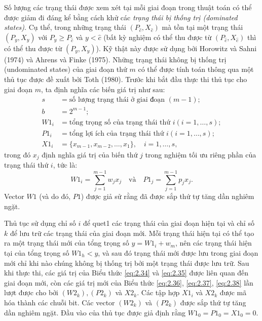 Số lượng các trạng thái được xem xét tại mỗi giai đoạn trong thuật toán có thể được giảm đi đáng kể bằng cách khử các \emph{trạng thái bị thống trị (dominated states)}. Cụ thể, trong những trạng thái $(P_{\hat{c}}, X_{\hat{c}})$ mà tồn tại một trạng thái $(P_y, X_y)$ với $P_y \geq P_{\hat{c}}$ và $y < \hat{c}$ (bất kỳ nghiệm có thể thu được từ $(P_{\hat{c}}, X_{\hat{c}})$ thì có thể thu được từ $(P_y, X_y)$). Kỹ thật này được sử dụng bởi Horowitz và Sahni (1974) và Ahrens và Finke (1975). Những trạng thái không bị thống trị (undominated states) của giai đoạn thứ $m$ có thể được tính toán thông qua một thủ tục được đề xuất bởi Toth (1980). Trước khi bắt đầu thực thi thủ tục cho giai đoạn $m$, ta định nghĩa các biến giá trị như sau:
\begin{align}
    \label{eq:2.34}
    s &= \text{số lượng trạng thái ở giai đoạn }(m - 1);\\
    \label{eq:2.35}
    b &= 2^{m-1};\\
    \label{eq:2.36}
    W1_i &= \text{tổng trọng số của trạng thái thứ }i (i=1, \dots, s);\\
    \label{eq:2.37}
    P1_i &= \text{tổng lợi ích của trạng thái thứ }i (i=1, \dots, s);\\
    \label{eq:2.38}
    X1_i &= \{x_{m-1}, x_{m-2},\dots, x_1\},\quad i = 1,\dots,s,
\end{align}
trong đó $x_j$ định nghĩa giá trị của biến thứ $j$ trong nghiệm tối ưu riêng phần của trạng thái thứ $i$, tức là:
\begin{equation*}
    W1_i = \sum_{j=1}^{m-1}w_jx_j\quad\text{và}\quad P1_j = \sum_{j=1}^{m-1}p_jx_j.
\end{equation*}
Vector $W1$ (và do đó, $P1$) được giả sử rằng đã được sắp thứ tự tăng dần nghiêm ngặt.

Thủ tục sử dụng chỉ số $i$ để quet1 các trạng thái của giai đoạn hiện tại và chỉ số $k$ để lưu trữ các trạng thái của giai đoạn mới. Mỗi trạng thái hiện tại có thể tạo ra một trạng thái mới của tổng trọng số $y = W1_{i} + w_m$, nên các trạng thái hiện tại của tổng trọng số $W1_h < y$, và sau đó trạng thái mới được lưu trong giai đoạn mới chỉ khi nào chúng không bị thống trị bởi một trạng thái được lưu trữ. Sau khi thực thi, các giá trị của Biểu thức \eqref{eq:2.34} và \eqref{eq:2.35} được liên quan đến giai đoạn mới, còn các giá trị mới của Biểu thức \eqref{eq:2.36}, \eqref{eq:2.37}, \eqref{eq:2.38} lần lượt được cho bởi $(W2_k), (P2_k)$ và $X2_k$. Các tập hợp $X1_i$ và $X2_k$ được mã hóa thành các chuỗi bit. Các vector $(W2_k)$ và $(P2_k)$ được sắp thứ tự tăng dần nghiêm ngặt. Đầu vào của thủ tục được giả định rằng $W1_0 = P1_0 = X1_0 = 0$.

